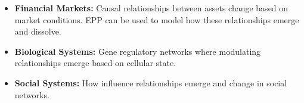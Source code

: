 \begin{itemize}
    \item \textbf{Financial Markets:}  Causal relationships between assets change based on market conditions. EPP can be used to model how these relationships emerge and dissolve.
    \item \textbf{Biological Systems:} Gene regulatory networks where modulating relationships emerge based on cellular state.
    \item \textbf{Social Systems:} How influence relationships emerge and change in social networks.
\end{itemize}